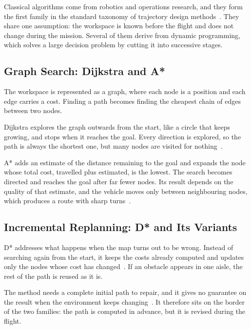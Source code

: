 Classical algorithms come from robotics and operations research, and they form
the first family in the standard taxonomy of trajectory design
methods~\cite{krayani2023goal}. They share one assumption: the workspace is known
before the flight and does not change during the mission. Several of them derive
from dynamic programming, which solves a large decision problem by cutting it
into successive stages.

\subsection{Graph Search: Dijkstra and A*}%
\label{subsec:nav:graphsearch}

The workspace is represented as a graph, where each node is a position and each
edge carries a cost. Finding a path becomes finding the cheapest chain of edges
between two nodes.

Dijkstra explores the graph outwards from the start, like a circle that keeps
growing, and stops when it reaches the goal. Every direction is explored, so the
path is always the shortest one, but many nodes are visited for
nothing~\cite{chang2023review}.

A* adds an estimate of the distance remaining to the goal and expands the node
whose total cost, travelled plus estimated, is the lowest. The search becomes
directed and reaches the goal after far fewer nodes. Its result depends on the
quality of that estimate, and the vehicle moves only between neighbouring nodes,
which produces a route with sharp turns~\cite{kumar2025comprehensive}.

\subsection{Incremental Replanning: D* and Its Variants}%
\label{subsec:nav:dstar}

D* addresses what happens when the map turns out to be wrong. Instead of
searching again from the start, it keeps the costs already computed and updates
only the nodes whose cost has changed~\cite{krayani2023goal}. If an obstacle
appears in one aisle, the rest of the path is reused as it is.

The method needs a complete initial path to repair, and it gives no guarantee on
the result when the environment keeps
changing~\cite{kumar2025comprehensive, krayani2023goal}. It therefore sits on the
border of the two families: the path is computed in advance, but it is revised
during the flight.

